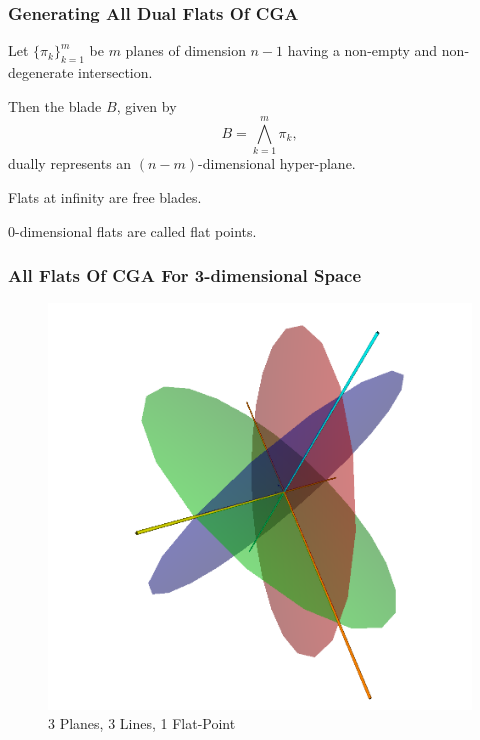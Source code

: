 \documentclass{beamer}
\begin{document}
\begin{frame}
\frametitle{Generating All \alert{Dual Flats} Of CGA}
Let $\{\pi_k\}_{k=1}^m$ be $m$ planes of dimension $n-1$ having a \alert{non-empty} and
\alert{non-degenerate} intersection.\pause

Then the blade $B$, given by
\begin{equation*}
B = \bigwedge_{k=1}^m\pi_k,
\end{equation*}
\alert{dually} represents an $(n-m)$-dimensional hyper-plane.\pause

\alert{Flats} at infinity are \alert{free blades}.\pause

$0$-dimensional \alert{flats} are called \alert{flat points}.
\end{frame}

\begin{frame}
\frametitle{All Flats Of CGA For 3-dimensional Space}
\begin{figure}
\centering
\includegraphics[scale=0.2]{Flats}
\caption{3 Planes, 3 Lines, 1 Flat-Point}
\end{figure}
\end{frame}
\end{document}
